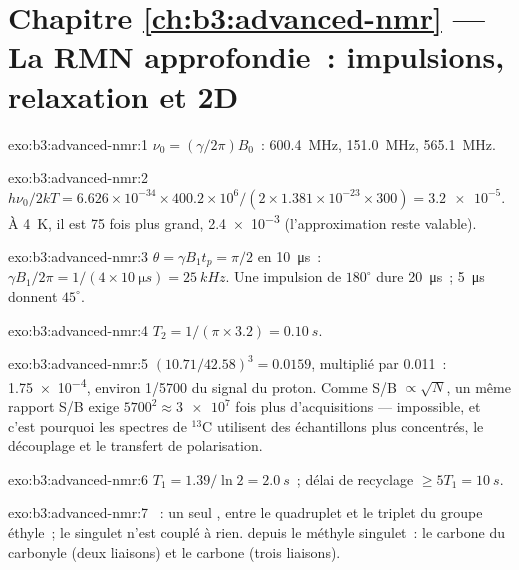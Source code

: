 \section*{Chapitre \ref{ch:b3:advanced-nmr} --- La RMN approfondie~: impulsions, relaxation et 2D}

\begin{solution}{exo:b3:advanced-nmr:1}
$\nu_0 = (\gamma/2\pi)B_0$~:  \qty{600.4}{MHz},  \qty{151.0}{MHz}, 
\qty{565.1}{MHz}.
\end{solution}

\begin{solution}{exo:b3:advanced-nmr:2}
$h\nu_0/2kT = 6.626\times10^{-34} \times 400.2\times10^6/(2 \times 1.381\times10^{-23} \times 300)
= \num{3.2e-5}$. À \qty{4}{K}, il est 75 fois plus grand, \num{2.4e-3}
(l'approximation reste valable).
\end{solution}

\begin{solution}{exo:b3:advanced-nmr:3}
$\theta = \gamma B_1t_p = \pi/2$ en \qty{10}{\micro s}~: $\gamma B_1/2\pi = 1/(4 \times
\qty{10}{\micro s}) = \qty{25}{kHz}$. Une impulsion de $180^\circ$ dure
\qty{20}{\micro s}~; \qty{5}{\micro s}
donnent $45^\circ$.
\end{solution}

\begin{solution}{exo:b3:advanced-nmr:4}
$T_2 = 1/(\pi \times 3.2) = \qty{0.10}{s}$.
\end{solution}

\begin{solution}{exo:b3:advanced-nmr:5}
$(10.71/42.58)^3 = 0.0159$, multiplié par 0.011~: \num{1.75e-4}, environ
1/5700 du signal du proton. Comme S/B $\propto\sqrt N$, un même rapport
S/B exige $5700^2 \approx \num{3e7}$ fois plus d'acquisitions ---
impossible, et c'est pourquoi les spectres de ${}^{13}$C utilisent des
échantillons plus concentrés, le découplage et le transfert de
polarisation.
\end{solution}

\begin{solution}{exo:b3:advanced-nmr:6}
$T_1 = 1.39/\ln2 = \qty{2.0}{s}$~; délai de recyclage $\ge 5T_1 = \qty{10}{s}$.
\end{solution}

\begin{solution}{exo:b3:advanced-nmr:7}
~: un seul , entre le quadruplet  et le
triplet  du groupe éthyle~; le singulet  n'est couplé à
rien.  depuis le méthyle singulet~: le carbone du carbonyle (deux
liaisons) et le carbone  (trois liaisons).
\end{solution}

